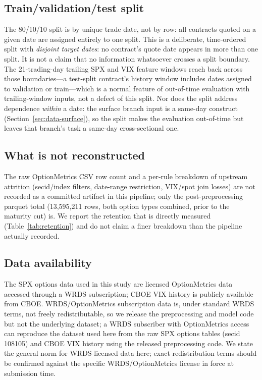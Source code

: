 \documentclass[11pt]{article}
\begin{document}
\subsection{Train/validation/test split}
The 80/10/10 split is by unique trade date, not by row: all contracts quoted on a given date are
assigned entirely to one split. This is a deliberate, time-ordered split with \emph{disjoint target
dates}: no contract's quote date appears in more than one split. It is not a claim that no information
whatsoever crosses a split boundary. The 21-trading-day trailing SPX and VIX feature windows reach back
across those boundaries---a test-split contract's history window includes dates assigned to
validation or train---which is a normal feature of out-of-time evaluation with trailing-window
inputs, not a defect of this split. Nor does the split address dependence \emph{within} a date: the
surface branch input is a same-day construct (Section~\ref{sec:data-surface}), so the split makes the
evaluation out-of-time but leaves that branch's task a same-day cross-sectional one.

\subsection{What is not reconstructed}
The raw OptionMetrics CSV row count and a per-rule breakdown of upstream attrition (secid/index
filters, date-range restriction, VIX/spot join losses) are not recorded as a committed artifact in this
pipeline; only the post-preprocessing parquet total (13{,}595{,}211 rows, both option types combined,
prior to the maturity cut) is. We report the retention that is directly measured
(Table~\ref{tab:retention}) and do not claim a finer breakdown than the pipeline actually recorded.

\subsection{Data availability}
\label{sec:data-availability}
The SPX options data used in this study are licensed OptionMetrics data accessed through a WRDS
subscription; CBOE VIX history is publicly available from CBOE. WRDS/OptionMetrics subscription data
is, under standard WRDS terms, not freely redistributable, so we release the preprocessing and model
code but not the underlying dataset; a WRDS subscriber with OptionMetrics access can reproduce the
dataset used here from the raw SPX options tables (secid 108105) and CBOE VIX history using the
released preprocessing code. We state the general norm for WRDS-licensed data here; exact
redistribution terms should be confirmed against the specific WRDS/OptionMetrics license in force at
submission time.
\end{document}
